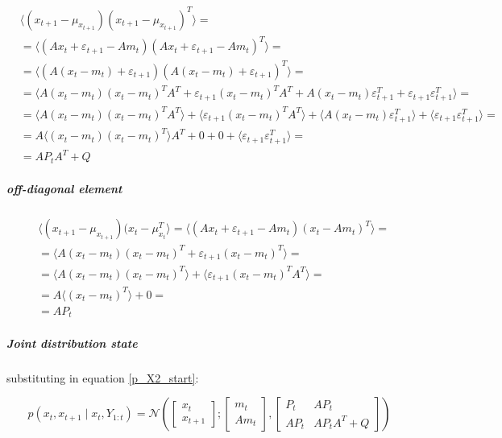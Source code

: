 \documentclass{article}
\newcommand{\E}[1]{\langle #1 \rangle} %
\newcommand{\norm}[3]{\mathcal{N}\left(#1; #2, #3\right)} %
\begin{document}
\begin{equation}\label{eq:cov_x_t1_x_t1}
\begin{split}
    &\E{(x_{t+1}-\mu_{x_{t+1}})(x_{t+1}-\mu_{x_{t+1}})^T} =\\
    &=\E{(Ax_t + \varepsilon_{t+1} - Am_t)(Ax_t + \varepsilon_{t+1}- Am_t)^T} =\\
    &= \E{(A(x_t - m_t) + \varepsilon_{t+1})(A(x_t - m_t) + \varepsilon_{t+1})^T} =\\
    &=\E{A(x_t-m_t)(x_t-m_t)^TA^T + \varepsilon_{t+1}(x_t-m_t)^TA^T + A(x_t-m_t)\varepsilon_{t+1}^T + \varepsilon_{t+1}\varepsilon_{t+1}^T} =\\&=\E{A(x_t-m_t)(x_t-m_t)^TA^T} + \E{\varepsilon_{t+1}(x_t-m_t)^TA^T} + \E{A(x_t-m_t)\varepsilon_{t+1}^T} + \E{\varepsilon_{t+1}\varepsilon_{t+1}^T} =\\
    &=A\E{(x_t-m_t)(x_t-m_t)^T}A^T + 0 + 0 + \E{\varepsilon_{t+1}\varepsilon_{t+1}^T} = \\
    &=AP_tA^T + Q
\end{split}
\end{equation}

\subparagraph{off-diagonal element}

\begin{equation}\label{eq:cov_x_t1_x_t}
\begin{split}
    &\E{(x_{t+1}-\mu_{x_{t+1}}) (x_{t}-\mu_{x_{t}}^T} = \E{(Ax_t + \varepsilon_{t+1} -Am_t)(x_t - Am_t)^T} =\\
    &=\E{A(x_t - m_t)(x_t - m_t)^T + \varepsilon_{t+1}(x_t - m_t)^T} =\\&=\E{A(x_t - m_t)(x_t - m_t)^T} + \E{\varepsilon_{t+1}(x_t - m_t)^TA^T} =\\
    &=A\E{(x_t - m_t)^T} + 0 = \\
    &=AP_t
\end{split}
\end{equation}

\subparagraph{Joint distribution state}

substituting in equation \ref{p_X2_start}:

\begin{equation}\label{p_X2_final}
p(x_t, x_{t+1}\mid x_t, Y_{1:t}) = \norm{\begin{bmatrix}x_t\\x_{t+1}\end{bmatrix}}{\begin{bmatrix}m_t\\Am_t\end{bmatrix}}
{\begin{bmatrix}P_t & AP_t\\AP_t & AP_tA^T + Q\end{bmatrix}}
\end{equation}
\end{document}
